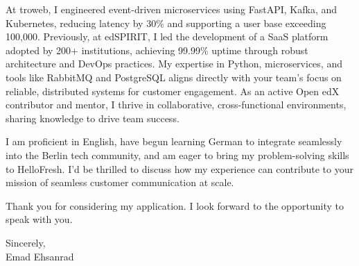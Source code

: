 \documentclass[a5paper,12pt]{article}
\begin{document}
At troweb, I engineered event-driven microservices using FastAPI, Kafka, and Kubernetes, reducing latency by 30\% and supporting a user base exceeding 100,000. Previously, at edSPIRIT, I led the development of a SaaS platform adopted by 200+ institutions, achieving 99.99\% uptime through robust architecture and DevOps practices. My expertise in Python, microservices, and tools like RabbitMQ and PostgreSQL aligns directly with your team’s focus on reliable, distributed systems for customer engagement. As an active Open edX contributor and mentor, I thrive in collaborative, cross-functional environments, sharing knowledge to drive team success.

I am proficient in English, have begun learning German to integrate seamlessly into the Berlin tech community, and am eager to bring my problem-solving skills to HelloFresh. I’d be thrilled to discuss how my experience can contribute to your mission of seamless customer communication at scale.

Thank you for considering my application. I look forward to the opportunity to speak with you.

Sincerely,\\
Emad Ehsanrad
\vspace{-0.5cm}
\end{document}
